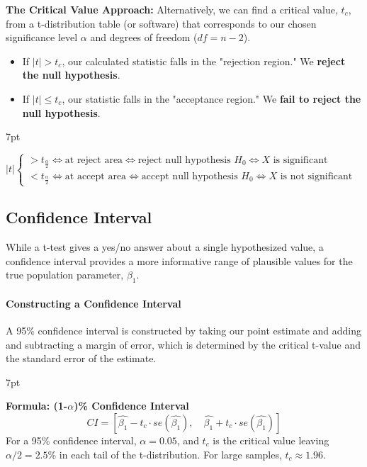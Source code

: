 \documentclass{article}
\providecommand{\tightlist}{
  \setlength{\itemsep}{0pt}
  \setlength{\parskip}{0pt}}
\newenvironment{blueblock}{
\def\FrameCommand{
  \hspace{1pt}
    {\color{DarkBlue}
    \vrule width 2pt}
    {\color{blueshade}
    \vrule width 4pt}
  \colorbox{blueshade}
}
\MakeFramed{
  \advance
  \hsize-
  \width
  \FrameRestore}
\noindent\hspace{-4.55pt}%
\begin{adjustwidth}{}{7pt}
\vspace{2pt}\vspace{2pt}
}
{\vspace{2pt}\end{adjustwidth}\endMakeFramed}
\newenvironment{greenblock}{%
\def\FrameCommand{%
  \hspace{1pt}%
    {\color{Green}%
    \vrule width 2pt}%
    {\color{greenshade}%
    \vrule width 4pt}%
  \colorbox{greenshade}%
}%
\MakeFramed{%
  \advance%
  \hsize-%
  \width%
  \FrameRestore}%
\noindent\hspace{-4.55pt}%
\begin{adjustwidth}{}{7pt}%
\vspace{2pt}\vspace{2pt}%
}
{%
\vspace{2pt}\end{adjustwidth}\endMakeFramed%
}
\begin{document}
\textbf{The Critical Value Approach:} Alternatively, we can find a critical value, $t_c$, from a t-distribution table (or software) that corresponds to our chosen significance level $\alpha$ and degrees of freedom ($df=n-2$).

\begin{itemize}
\tightlist
  \item If $|t| > t_c$, our calculated statistic falls in the "rejection region." We \textbf{reject the null hypothesis}.
  \item If $|t| \le t_c$, our statistic falls in the "acceptance region." We \textbf{fail to reject the null hypothesis}.
\end{itemize}


\begin{blueblock}
$|t|
\begin{cases}
>t_{\frac{\alpha}{2}} \iff \text{at reject area} \iff \text{reject null hypothesis $H_0$} \iff \text{$X$ is significant}
\\
<t_{\frac{\alpha}{2}} \iff \text{at accept area} \iff \text{accept null hypothesis $H_0$} \iff \text{$X$ is not significant}
\end{cases}$
\end{blueblock}



\subsection{Confidence Interval} %
\label{subp:confidence_interval}

While a t-test gives a yes/no answer about a single hypothesized value, a confidence interval provides a more informative range of plausible values for the true population parameter, $\beta_1$.

\paragraph{Constructing a Confidence Interval}
A 95\% confidence interval is constructed by taking our point estimate and adding and subtracting a margin of error, which is determined by the critical t-value and the standard error of the estimate.

\begin{greenblock}
\textbf{Formula: (1-$\alpha$)\% Confidence Interval}
\begin{equation}
  CI = [\hat{\beta_1} - t_{c} \cdot se(\hat{\beta_1}), \quad \hat{\beta_1} + t_{c} \cdot se(\hat{\beta_1})]
\end{equation}
For a 95\% confidence interval, $\alpha=0.05$, and $t_c$ is the critical value leaving $\alpha/2 = 2.5\%$ in each tail of the t-distribution. For large samples, $t_c \approx 1.96$.
\end{greenblock}
\end{document}
